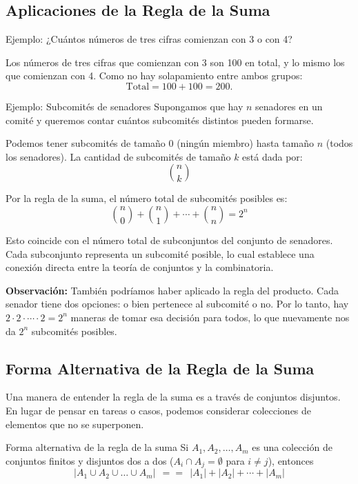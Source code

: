 \subsection{Aplicaciones de la Regla de la Suma}

\begin{exampleblock}{Ejemplo:} 
¿Cuántos números de tres cifras comienzan con 3 o con 4?

Los números de tres cifras que comienzan con 3 son 100 en total, y lo mismo los que comienzan con 4. Como no hay solapamiento entre ambos grupos:
\[
\text{Total} = 100 + 100 = 200.
\]
\end{exampleblock}

\begin{exampleblock}{Ejemplo: Subcomités de senadores}
Supongamos que hay $n$ senadores en un comité y queremos contar cuántos subcomités distintos pueden formarse.

Podemos tener subcomités de tamaño 0 (ningún miembro) hasta tamaño $n$ (todos los senadores). La cantidad de subcomités de tamaño $k$ está dada por:
\[ \binom{n}{k} \]

Por la regla de la suma, el número total de subcomités posibles es:
\[ \binom{n}{0} + \binom{n}{1} + \cdots + \binom{n}{n} = 2^n \]

Esto coincide con el número total de subconjuntos del conjunto de senadores. Cada subconjunto representa un subcomité posible, lo cual establece una conexión directa entre la teoría de conjuntos y la combinatoria.

\medskip

\textbf{Observación:} También podríamos haber aplicado la regla del producto. Cada senador tiene dos opciones: o bien pertenece al subcomité o no. Por lo tanto, hay $2 \cdot 2 \cdot \cdots \cdot 2 = 2^n$ maneras de tomar esa decisión para todos, lo que nuevamente nos da $2^n$ subcomités posibles.
\end{exampleblock}


\subsection{Forma Alternativa de la Regla de la Suma}

Una manera de entender la regla de la suma es a través de conjuntos disjuntos. En lugar de pensar en tareas o casos, podemos considerar colecciones de elementos que no se superponen. 

\begin{exampleblock}{Forma alternativa de la regla de la suma}
 Si $A_1, A_2, \ldots, A_m$ es una colección de conjuntos finitos y disjuntos dos a dos ($A_i \cap A_j = \emptyset$ para $i\neq j$), entonces
 \[
   | A_1 \cup A_2 \cup \ldots \cup A_m| ~~==~~ |A_1| + |A_2| + \cdots + |A_m|
 \]
\end{exampleblock}

